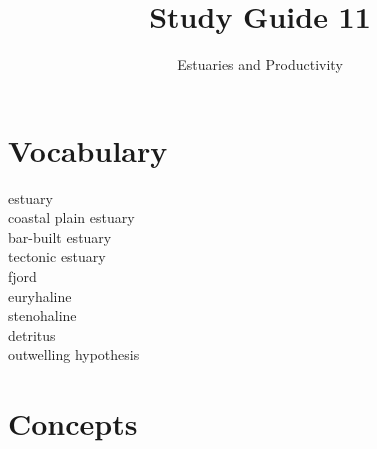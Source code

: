 \documentclass[nofonts, letterpaper]{tufte-handout}
\title{Study Guide 11}
\author{Estuaries and Productivity}
\date{} %
\begin{document}
\maketitle	%


\section{Vocabulary}
\vspace{-1\baselineskip}
\begin{multicols}{2}
estuary \\
coastal plain estuary \\
bar-built estuary \\
tectonic estuary \\
fjord \\
euryhaline \\
stenohaline \\
detritus \\
outwelling hypothesis
\end{multicols}

\section{Concepts}
\end{document}
